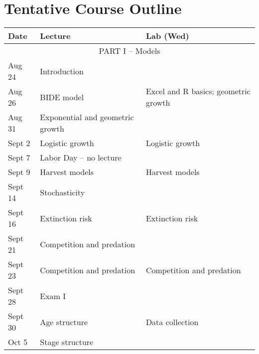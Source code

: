 \documentclass[12pt]{article}
\begin{document}

\section*{\normalsize Tentative Course Outline}

\begin{center}
\begin{tabular}[c]{lll}
\hline \hline
{\bf Date} & {\bf Lecture}                      & {\bf Lab (Wed)}                      \\
\hline
           \multicolumn{3}{c}{PART I -- Models}                                        \\
\hline
\hline
Aug 24     & Introduction                       &                                      \\
Aug 26     & BIDE model                         & Excel and R basics; geometric growth \\
\hline
Aug 31     & Exponential and geometric growth   &                                      \\
Sept 2     & Logistic growth                    & Logistic growth                      \\
\hline
Sept 7     & Labor Day -- no lecture            &                                      \\
Sept 9     & Harvest models                     & Harvest models                       \\
\hline
Sept 14    & Stochasticity                      &                                      \\
Sept 16    & Extinction risk                    & Extinction risk                      \\
\hline
Sept 21    & Competition and predation          &                                      \\
Sept 23    & Competition and predation          & Competition and predation            \\
\hline
Sept 28    & Exam I                             &                                      \\
Sept 30    & Age structure                      & Data collection                      \\
\hline
Oct 5      & Stage structure                    &                                      \\

\end{tabular}
\end{center}
\end{document}
